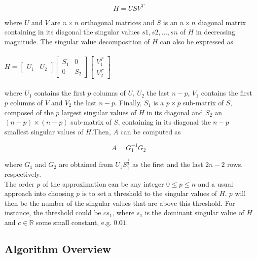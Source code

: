 \documentclass[a4paper,11pt,twoside]{report}
\begin{document}
\begin{equation}
H = USV^T
\end{equation}

where $U$ and $V$ are $n \times n$ orthogonal matrices and $S$ is an $n \times n$ diagonal matrix containing in its diagonal the singular values $s1, s2, \dots, sn$ of $H$ in decreasing magnitude. The singular value decomposition of $H$ can also be expressed as \\\\

$H = \begin{bmatrix}
U_1 & U_2 
\end{bmatrix}
\begin{bmatrix}
S_1 & 0 \\
0 & S_2
\end{bmatrix}
\begin{bmatrix}
V_1^T \\
V_2^T
\end{bmatrix}
$\\\\


where $U_1$ contains the first $p$ columns of $U$, $U_2$ the last $n-p$, $V_1$ contains the first $p$ columns of $V$ and $V_2$ the last $n-p$. Finally, $S_1$ is a $p \times p$ sub-matrix of $S$, composed of the $p$ largest singular values of $H$ in its diagonal and $S_2$ an $ (n-p) \times (n-p)$ sub-matrix of $S$, containing in its diagonal the $n-p$ smallest singular values of $H$.Then, $A$ can be computed as  

\begin{equation}
A = G_1^{-1}G_2
\end{equation}

where $G_1$ and $G_2$ are obtained from $U_1S_1^{\frac{1}{2}}$ as the first and the last $2n-2$ rows, respectively.\\

The order $p$ of the approximation can be any integer $0 \le p \le n$ and a usual approach into choosing $p$ is to set a threshold to the singular values of $H$. $p$ will then be the number of the singular values that are above this threshold. For instance, the threshold could be $cs_1$, where $s_1$ is the dominant singular value of $H$ and $c \in \mathbb{R}$ some small constant, e.g. $ 0.01$.

\subsection{Algorithm Overview}
\end{document}
